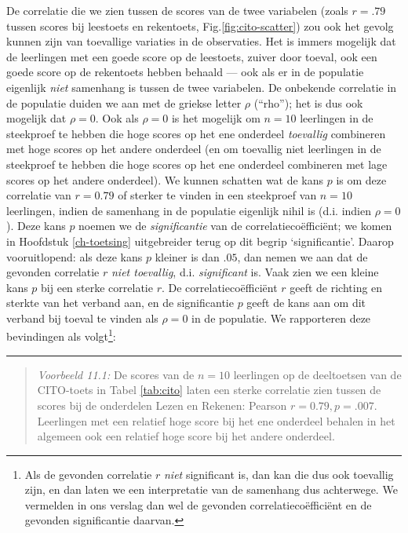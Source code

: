 \documentclass[
]{book}
\begin{document}
De correlatie die we zien tussen de scores van de twee variabelen (zoals
\(r=.79\) tussen scores bij leestoets en rekentoets,
Fig.\ref{fig:cito-scatter}) zou ook het gevolg kunnen zijn van
toevallige variaties in de observaties. Het is immers mogelijk dat de
leerlingen met een goede score op de leestoets, zuiver door toeval, ook
een goede score op de rekentoets hebben behaald --- ook als er in de
populatie eigenlijk \emph{niet} samenhang is tussen de twee variabelen. De
onbekende correlatie in de populatie duiden we aan met de griekse letter
\(\rho\) (``rho''); het is dus ook mogelijk dat \(\rho=0\). Ook als \(\rho=0\)
is het mogelijk om \(n=10\) leerlingen in de steekproef te hebben die hoge
scores op het ene onderdeel \emph{toevallig} combineren met hoge scores op
het andere onderdeel (en om toevallig niet leerlingen in de steekproef
te hebben die hoge scores op het ene onderdeel combineren met lage
scores op het andere onderdeel). We kunnen schatten wat de kans \(p\) is
om deze correlatie van \(r=0.79\) of sterker te vinden in een steekproef
van \(n=10\) leerlingen, indien de samenhang in de populatie eigenlijk
nihil is (d.i. indien \(\rho=0\)). Deze kans \(p\) noemen we de
\emph{significantie} van de correlatiecoëfficiënt; we komen in
Hoofdstuk \ref{ch-toetsing} uitgebreider terug op dit begrip
`significantie'. Daarop vooruitlopend: als deze kans \(p\) kleiner is dan
\(.05\), dan nemen we aan dat de gevonden correlatie \(r\) \emph{niet toevallig},
d.i. \emph{significant} is. Vaak zien we een kleine kans \(p\) bij een sterke
correlatie \(r\). De correlatiecoëfficiënt \(r\) geeft de richting en
sterkte van het verband aan, en de significantie \(p\) geeft de kans aan
om dit verband bij toeval te vinden als \(\rho=0\) in de populatie. We
rapporteren deze bevindingen als volgt\footnote{Als de gevonden correlatie \(r\) \emph{niet} significant is, dan kan die dus ook toevallig zijn, en dan laten we een interpretatie van de samenhang dus achterwege. We vermelden in ons verslag dan wel de gevonden correlatiecoëfficiënt en de gevonden significantie daarvan.}:

\begin{center}\rule{0.5\linewidth}{0.5pt}\end{center}

\begin{quote}
\emph{Voorbeeld 11.1:}
De scores van de \(n=10\) leerlingen op de deeltoetsen van de CITO-toets
in Tabel \ref{tab:cito} laten een sterke correlatie zien tussen de scores
bij de onderdelen Lezen en Rekenen: Pearson \(r=0.79, p=.007\). Leerlingen
met een relatief hoge score bij het ene onderdeel behalen in het
algemeen ook een relatief hoge score bij het andere onderdeel.
\end{quote}
\end{document}
